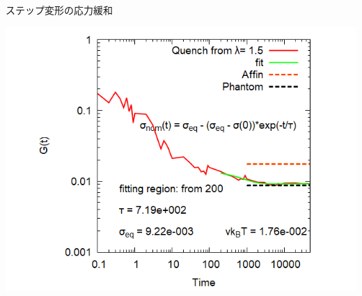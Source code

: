 \documentclass[aspectratio=169,11pt, dvipdfmx]{beamer}
\begin{document}
\begin{frame}
\begin{columns}[totalwidth=\linewidth]
\begin{exampleblock}{ステップ変形の応力緩和}
\begin{itemize}
                    \end{itemize}
					\centering
                        \includegraphics[width=.75\columnwidth]{gt_sunuke.png}
				\end{exampleblock}
		\end{columns}
\end{frame}
\end{document}

